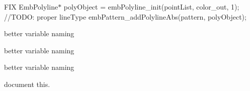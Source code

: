 \begin{DoxyRefList}
%
FIX Emb\+Polyline$\ast$ poly\+Object = emb\+Polyline\+\_\+init(point\+List, color\+\_\+out, 1); //\+TODO\+: proper line\+Type emb\+Pattern\+\_\+add\+Polyline\+Abs(pattern, poly\+Object);  
\item[Member \mbox{\hyperlink{struct_sub_descriptor___affb2c75b7f632338f368aafab49f678d}{Sub\+Descriptor\+\_\+\+::color\+Code}} ]\label{todo__todo000210}%
%
better variable naming  
\item[Member \mbox{\hyperlink{struct_sub_descriptor___a0cfe04519ff6dab092ee7c002e55e520}{Sub\+Descriptor\+\_\+\+::some\+Int}} ]\label{todo__todo000208}%
%
better variable naming  
\item[Member \mbox{\hyperlink{struct_sub_descriptor___a6154b0f4ec7815c6d26c71852506418e}{Sub\+Descriptor\+\_\+\+::some\+Other\+Int}} ]\label{todo__todo000209}%
%
better variable naming  
\item[Member \mbox{\hyperlink{embroidermodder_8h_a459ace9a6c614fe41b7f08ba91bc6dd4}{Undo\+History}} ]\label{todo__todo000001}%
%
document this. 
\end{DoxyRefList}